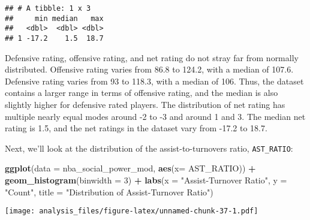 \documentclass[]{article}
\newenvironment{Shaded}{\begin{snugshade}}{\end{snugshade}}
\newcommand{\DataTypeTok}[1]{\textcolor[rgb]{0.13,0.29,0.53}{#1}}
\newcommand{\DecValTok}[1]{\textcolor[rgb]{0.00,0.00,0.81}{#1}}
\newcommand{\FloatTok}[1]{\textcolor[rgb]{0.00,0.00,0.81}{#1}}
\newcommand{\KeywordTok}[1]{\textcolor[rgb]{0.13,0.29,0.53}{\textbf{#1}}}
\newcommand{\NormalTok}[1]{#1}
\newcommand{\OperatorTok}[1]{\textcolor[rgb]{0.81,0.36,0.00}{\textbf{#1}}}
\newcommand{\StringTok}[1]{\textcolor[rgb]{0.31,0.60,0.02}{#1}}
\begin{document}
\begin{Shaded}
\end{Shaded}

\begin{verbatim}
## # A tibble: 1 x 3
##     min median   max
##   <dbl>  <dbl> <dbl>
## 1 -17.2    1.5  18.7
\end{verbatim}

Defensive rating, offensive rating, and net rating do not stray far from
normally distributed. Offensive rating varies from 86.8 to 124.2, with a
median of 107.6. Defensive rating varies from 93 to 118.3, with a median
of 106. Thus, the dataset contains a larger range in terms of offensive
rating, and the median is also slightly higher for defensive rated
players. The distribution of net rating has multiple nearly equal modes
around -2 to -3 and around 1 and 3. The median net rating is 1.5, and
the net ratings in the dataset vary from -17.2 to 18.7.

Next, we'll look at the distribution of the assist-to-turnovers ratio,
\texttt{AST\_RATIO}:

\begin{Shaded}
\begin{Highlighting}[]
\KeywordTok{ggplot}\NormalTok{(}\DataTypeTok{data =}\NormalTok{ nba_social_power_mod, }\KeywordTok{aes}\NormalTok{(}\DataTypeTok{x=}\NormalTok{ AST_RATIO)) }\OperatorTok{+}\StringTok{ }
\StringTok{  }\KeywordTok{geom_histogram}\NormalTok{(}\DataTypeTok{binwidth =} \DecValTok{3}\NormalTok{) }\OperatorTok{+}
\StringTok{  }\KeywordTok{labs}\NormalTok{(}\DataTypeTok{x =} \StringTok{"Assist-Turnover Ratio"}\NormalTok{, }\DataTypeTok{y =} \StringTok{"Count"}\NormalTok{,}
       \DataTypeTok{title =} \StringTok{"Distribution of Assist-Turnover Ratio"}\NormalTok{)}
\end{Highlighting}
\end{Shaded}

\texttt{[image: analysis\_files/figure-latex/unnamed-chunk-37-1.pdf]}

\begin{Shaded}
\end{Shaded}
\end{document}
